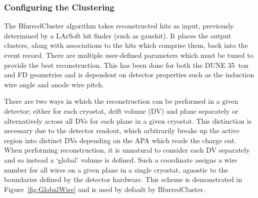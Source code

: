 \subsubsection{Configuring the Clustering}\label{sec:BlurredClusterConfiguration}

The BlurredCluster algorithm takes reconstructed hits as input, previously determined by a LArSoft hit finder (such as gaushit).  It places the output clusters, along with associations to the hits which comprise them, back into the event record.  There are multiple user-defined parameters which must be tuned to provide the best reconstruction.  This has been done for both the DUNE 35~ton and FD geometries and is dependent on detector properties such as the induction wire angle and anode wire pitch.

There are two ways in which the reconstruction can be performed in a given detector; either for each cryostat, drift volume (DV) and plane separately or alternatively across all DVs for each plane in a given cryostat.  This distinction is necessary due to the detector readout, which arbitrarily breaks up the active region into distinct DVs depending on the APA which reads the charge out.  When performing reconstruction, it is unnatural to consider each DV separately and so instead a `global' volume is defined.  Such a coordinate assigns a wire number for all wires on a given plane in a single cryostat, agnostic to the boundaries defined by the detector hardware.  This scheme is demonstrated in Figure~\ref{fig:GlobalWire} and is used by default by BlurredCluster.

